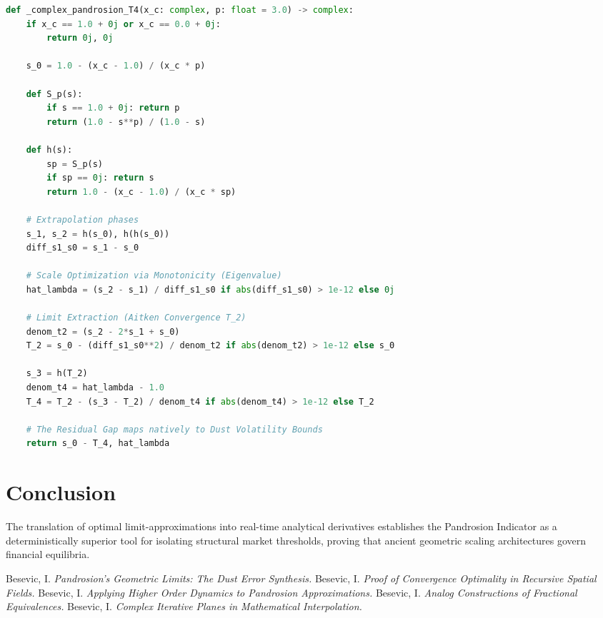 \documentclass[11pt,a4paper]{article}
\begin{document}
\begin{lstlisting}[language=Python, caption=Core Implementation of the Pandrosion Geometric Bounds]
def _complex_pandrosion_T4(x_c: complex, p: float = 3.0) -> complex:
    if x_c == 1.0 + 0j or x_c == 0.0 + 0j: 
        return 0j, 0j
        
    s_0 = 1.0 - (x_c - 1.0) / (x_c * p)
    
    def S_p(s):
        if s == 1.0 + 0j: return p
        return (1.0 - s**p) / (1.0 - s)
        
    def h(s):
        sp = S_p(s)
        if sp == 0j: return s
        return 1.0 - (x_c - 1.0) / (x_c * sp)
        
    # Extrapolation phases
    s_1, s_2 = h(s_0), h(h(s_0))
    diff_s1_s0 = s_1 - s_0
    
    # Scale Optimization via Monotonicity (Eigenvalue)
    hat_lambda = (s_2 - s_1) / diff_s1_s0 if abs(diff_s1_s0) > 1e-12 else 0j
    
    # Limit Extraction (Aitken Convergence T_2)
    denom_t2 = (s_2 - 2*s_1 + s_0)
    T_2 = s_0 - (diff_s1_s0**2) / denom_t2 if abs(denom_t2) > 1e-12 else s_0
    
    s_3 = h(T_2)
    denom_t4 = hat_lambda - 1.0
    T_4 = T_2 - (s_3 - T_2) / denom_t4 if abs(denom_t4) > 1e-12 else T_2
    
    # The Residual Gap maps natively to Dust Volatility Bounds
    return s_0 - T_4, hat_lambda
\end{lstlisting}

\section{Conclusion}
The translation of optimal limit-approximations \cite{pandrosion_analog} into real-time analytical derivatives establishes the Pandrosion Indicator as a deterministically superior tool for isolating structural market thresholds, proving that ancient geometric scaling architectures govern financial equilibria.

\begin{thebibliography}{9}
 Besevic, I. \textit{Pandrosion's Geometric Limits: The Dust Error Synthesis.}
 Besevic, I. \textit{Proof of Convergence Optimality in Recursive Spatial Fields.}
 Besevic, I. \textit{Applying Higher Order Dynamics to Pandrosion Approximations.}
 Besevic, I. \textit{Analog Constructions of Fractional Equivalences.}
 Besevic, I. \textit{Complex Iterative Planes in Mathematical Interpolation.}
\end{thebibliography}
\end{document}
